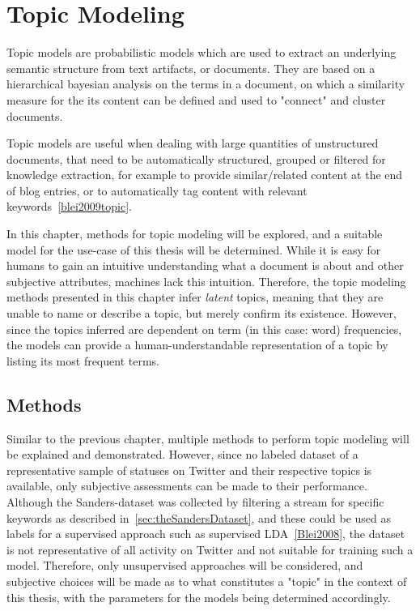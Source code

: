 \chapter{Topic Modeling}
\label{ch:topicModeling}

Topic models are probabilistic models which are used to extract an underlying semantic structure from text artifacts, or documents.
They are based on a hierarchical bayesian analysis on the terms in a document,
on which a similarity measure for the its content can be defined and used to "connect" and cluster documents.
\par
Topic models are useful when dealing with large quantities of unstructured documents,
that need to be automatically structured, grouped or filtered for knowledge extraction,
for example to provide similar/related content at the end of blog entries,
or to automatically tag content with relevant keywords~\ref{blei2009topic}.
\par
In this chapter, methods for topic modeling will be explored,
and a suitable model for the use-case of this thesis will be determined.
While it is easy for humans to gain an intuitive understanding what a document is about
and other subjective attributes, machines lack this intuition.
Therefore, the topic modeling methods presented in this chapter infer \textit{latent} topics,
meaning that they are unable to name or describe a topic, but merely confirm its existence.
However, since the topics inferred are dependent on term (in this case: word) frequencies,
the models can provide a human-understandable representation of a topic by listing its most frequent terms.

\section{Methods}
\label{sec:methods}

Similar to the previous chapter, multiple methods to perform topic modeling will be explained and demonstrated.
However, since no labeled dataset of a representative sample of statuses on Twitter and their respective topics is available,
only subjective assessments can be made to their performance.
Although the Sanders-dataset was collected by filtering a stream for specific keywords as described in~\ref{sec:theSandersDataset},
and these could be used as labels for a supervised approach such as supervised LDA~\ref{Blei2008},
the dataset is not representative of all activity on Twitter and not suitable for training such a model.
Therefore, only unsupervised approaches will be considered,
and subjective choices will be made as to what constitutes a "topic" in the context of this thesis,
with the parameters for the models being determined accordingly.

